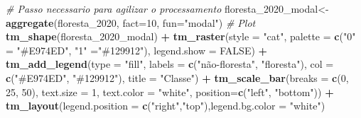\documentclass[
]{article}
\newenvironment{Shaded}{\begin{snugshade}}{\end{snugshade}}
\newcommand{\AttributeTok}[1]{\textcolor[rgb]{0.13,0.29,0.53}{#1}}
\newcommand{\CommentTok}[1]{\textcolor[rgb]{0.56,0.35,0.01}{\textit{#1}}}
\newcommand{\ConstantTok}[1]{\textcolor[rgb]{0.56,0.35,0.01}{#1}}
\newcommand{\DecValTok}[1]{\textcolor[rgb]{0.00,0.00,0.81}{#1}}
\newcommand{\FunctionTok}[1]{\textcolor[rgb]{0.13,0.29,0.53}{\textbf{#1}}}
\newcommand{\NormalTok}[1]{#1}
\newcommand{\OtherTok}[1]{\textcolor[rgb]{0.56,0.35,0.01}{#1}}
\newcommand{\SpecialCharTok}[1]{\textcolor[rgb]{0.81,0.36,0.00}{\textbf{#1}}}
\newcommand{\StringTok}[1]{\textcolor[rgb]{0.31,0.60,0.02}{#1}}
\begin{document}
\begin{Shaded}
\begin{Highlighting}[]
\CommentTok{\# Passo necessario para agilizar o processamento}
\NormalTok{floresta\_2020\_modal}\OtherTok{\textless{}{-}}\FunctionTok{aggregate}\NormalTok{(floresta\_2020, }\AttributeTok{fact=}\DecValTok{10}\NormalTok{, }\AttributeTok{fun=}\StringTok{"modal"}\NormalTok{)}
\CommentTok{\# Plot}
\FunctionTok{tm\_shape}\NormalTok{(floresta\_2020\_modal) }\SpecialCharTok{+}
  \FunctionTok{tm\_raster}\NormalTok{(}\AttributeTok{style =} \StringTok{"cat"}\NormalTok{, }
            \AttributeTok{palette =} \FunctionTok{c}\NormalTok{(}\StringTok{"0"} \OtherTok{=} \StringTok{"\#E974ED"}\NormalTok{, }\StringTok{"1"} \OtherTok{=}\StringTok{"\#129912"}\NormalTok{), }
            \AttributeTok{legend.show =} \ConstantTok{FALSE}\NormalTok{) }\SpecialCharTok{+} 
  \FunctionTok{tm\_add\_legend}\NormalTok{(}\AttributeTok{type =} \StringTok{"fill"}\NormalTok{, }\AttributeTok{labels =} \FunctionTok{c}\NormalTok{(}\StringTok{"não{-}floresta"}\NormalTok{, }\StringTok{"floresta"}\NormalTok{),}
    \AttributeTok{col =} \FunctionTok{c}\NormalTok{(}\StringTok{"\#E974ED"}\NormalTok{, }\StringTok{"\#129912"}\NormalTok{), }\AttributeTok{title =} \StringTok{"Classe"}\NormalTok{) }\SpecialCharTok{+}
\FunctionTok{tm\_scale\_bar}\NormalTok{(}\AttributeTok{breaks =} \FunctionTok{c}\NormalTok{(}\DecValTok{0}\NormalTok{, }\DecValTok{25}\NormalTok{, }\DecValTok{50}\NormalTok{), }\AttributeTok{text.size =} \DecValTok{1}\NormalTok{, }
             \AttributeTok{text.color =} \StringTok{"white"}\NormalTok{, }\AttributeTok{position=}\FunctionTok{c}\NormalTok{(}\StringTok{"left"}\NormalTok{, }\StringTok{"bottom"}\NormalTok{)) }\SpecialCharTok{+}
\FunctionTok{tm\_layout}\NormalTok{(}\AttributeTok{legend.position =} \FunctionTok{c}\NormalTok{(}\StringTok{"right"}\NormalTok{,}\StringTok{"top"}\NormalTok{),}\AttributeTok{legend.bg.color =} \StringTok{"white"}\NormalTok{)}
\end{Highlighting}
\end{Shaded}
\end{document}
